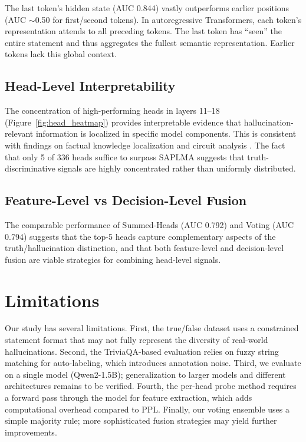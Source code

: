 \documentclass[11pt]{article}
\begin{document}
The last token's hidden state (AUC 0.844) vastly outperforms earlier positions (AUC $\sim$0.50 for first/second tokens). In autoregressive Transformers, each token's representation attends to all preceding tokens. The last token has ``seen'' the entire statement and thus aggregates the fullest semantic representation. Earlier tokens lack this global context.

\subsection{Head-Level Interpretability}

The concentration of high-performing heads in layers 11--18 (Figure~\ref{fig:head_heatmap}) provides interpretable evidence that hallucination-relevant information is localized in specific model components. This is consistent with findings on factual knowledge localization \citep{meng2022locating} and circuit analysis \citep{olah2020zoom}. The fact that only 5 of 336 heads suffice to surpass SAPLMA suggests that truth-discriminative signals are highly concentrated rather than uniformly distributed.

\subsection{Feature-Level vs Decision-Level Fusion}

The comparable performance of Summed-Heads (AUC 0.792) and Voting (AUC 0.794) suggests that the top-5 heads capture complementary aspects of the truth/hallucination distinction, and that both feature-level and decision-level fusion are viable strategies for combining head-level signals.

\section{Limitations}

Our study has several limitations. First, the true/false dataset uses a constrained statement format that may not fully represent the diversity of real-world hallucinations. Second, the TriviaQA-based evaluation relies on fuzzy string matching for auto-labeling, which introduces annotation noise. Third, we evaluate on a single model (Qwen2-1.5B); generalization to larger models and different architectures remains to be verified. Fourth, the per-head probe method requires a forward pass through the model for feature extraction, which adds computational overhead compared to PPL. Finally, our voting ensemble uses a simple majority rule; more sophisticated fusion strategies may yield further improvements.
\end{document}
